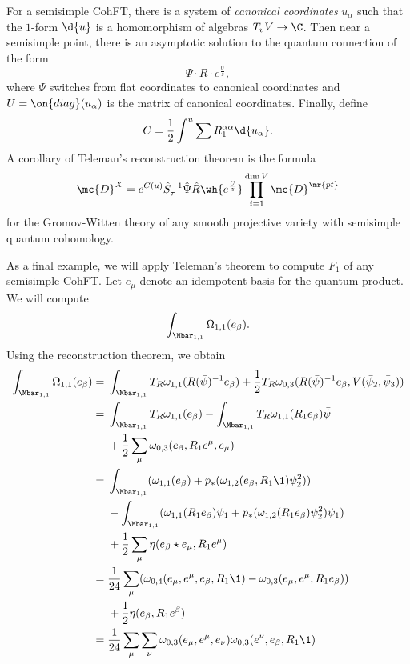 For a semisimple CohFT, there is a system of \textit{canonical coordinates} $u_{\alpha}$ such that the $1$-form $\d{u}$ is a homomorphism of algebras $T_v V \to \C$. Then near a semisimple point, there is an asymptotic solution to the quantum connection of the form
\[ \Psi \cdot  R \cdot e^{\frac{U}{z}}, \]
where $\Psi$ switches from flat coordinates to canonical coordinates and $U = \on{diag}(u_{\alpha})$ is the matrix of canonical coordinates. Finally, define
\[ C = \frac{1}{2} \int^u \sum R_1^{\alpha\alpha} \d{u_{\alpha}}. \]
A corollary of Teleman's reconstruction theorem is the formula
\[ \mc{D}^X = e^{C(u)} \hat{S}^{-1}_{\tau} \hat{\Psi} \hat{R} \wh{e^{\frac{U}{z}}} \prod_{i=1}^{\dim V} \mc{D}^{\mr{pt}} \]
for the Gromov-Witten theory of any smooth projective variety with semisimple quantum cohomology.

\begin{exm}
    As a final example, we will apply Teleman's theorem to compute $F_1$ of any semisimple CohFT. Let $e_{\mu}$ denote an idempotent basis for the quantum product. We will compute
    \[ \int_{\Mbar_{1,1}} \Omega_{1,1}(e_{\beta}). \]
    Using the reconstruction theorem, we obtain
    \begin{align*}
        \int_{\Mbar_{1,1}}\Omega_{1,1}(e_{\beta}) ={}& \int_{\Mbar_{1,1}} T_R \omega_{1,1}(R(\bar{\psi})^{-1} e_{\beta}) + \frac{1}{2} T_R \omega_{0,3}(R(\bar{\psi})^{-1} e_{\beta}, V(\bar{\psi}_2, \bar{\psi}_3)) \\
        ={}& \int_{\Mbar_{1,1}}T_R\omega_{1,1}(e_{\beta}) - \int_{\Mbar_{1,1}} T_R \omega_{1,1}(R_1 e_{\beta})\bar{\psi} \\ 
        &+ \frac{1}{2}\sum_{\mu}  \omega_{0,3}(e_{\beta}, R_1 e^{\mu}, e_{\mu}) \\
        ={}& \int_{\Mbar_{1,1}} ( \omega_{1,1}(e_{\beta}) + p_* ( \omega_{1,2}(e_{\beta}, R_1 \1) \bar{\psi}_2^2 )) \\
        &- \int_{\Mbar_{1,1}} (\omega_{1,1}(R_1 e_{\beta})\bar{\psi}_1 + p_* ( \omega_{1,2}(R_1 e_{\beta}) \bar{\psi}_2^2 ) \bar{\psi}_1) \\
        &+ \frac{1}{2} \sum_{\mu} \eta(e_{\beta} \star e_{\mu}, R_1 e^{\mu}) \\
        ={}& \frac{1}{24} \sum_{\mu} ( \omega_{0,4}(e_{\mu}, e^{\mu}, e_{\beta}, R_1 \1) -\omega_{0,3}(e_{\mu}, e^{\mu}, R_1 e_{\beta}) )\\
        &+ \frac{1}{2} \eta(e_{\beta}, R_1 e^{\beta}) \\
        ={}& \frac{1}{24} \sum_{\mu}\sum_{\nu} \omega_{0,3}(e_{\mu}, e^{\mu}, e_{\nu})\omega_{0,3}(e^{\nu}, e_{\beta}, R_1 \1) \\

\end{align*}
\end{exm}
